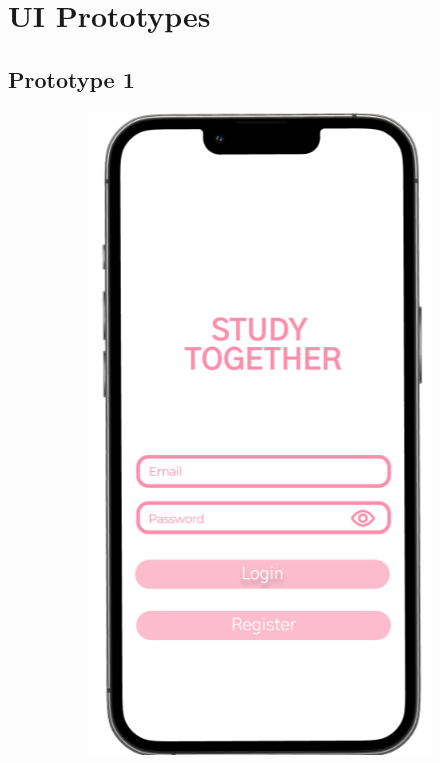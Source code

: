 \chapter{UI Prototypes}\label{ch:ui_prototypes}

\section{Prototype 1}

\begin{figure}[h]
  \centering
  \begin{subfigure}[b]{0.3\textwidth} %
    \includegraphics[width=\textwidth]{Figures/landing.png}

\end{subfigure}
\end{figure}
